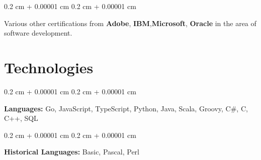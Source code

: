\documentclass[10pt, a4paper]{article}
\newenvironment{onecolentry}{
    \begin{adjustwidth}{
        0.2 cm + 0.00001 cm
    }{
        0.2 cm + 0.00001 cm
    }
}{
    \end{adjustwidth}
} %
\begin{document}
\begin{onecolentry}
    Various other certifications from \textbf{Adobe}, \textbf{IBM},\textbf{Microsoft}, \textbf{Oracle} in the area of software development.
\end{onecolentry}

\vspace{0.20 cm}


\section{Technologies}




\begin{onecolentry}
    \textbf{Languages:} Go, JavaScript, TypeScript, Python, Java, Scala, Groovy, C\#, C, C++, SQL
\end{onecolentry}

\vspace{0.2 cm}

\begin{onecolentry}
    \textbf{Historical Languages:} Basic, Pascal, Perl
\end{onecolentry}
\end{document}
